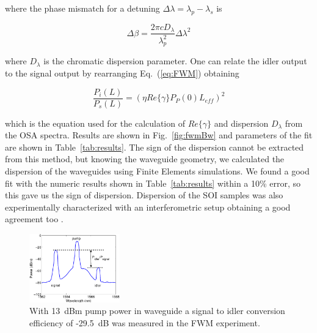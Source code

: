 \documentclass[10pt,letterpaper]{article}
\begin{document}
where the phase mismatch for a detuning $ \Delta\lambda = \lambda_p-\lambda_s$ is

\begin{equation}
        \Delta \beta=\frac{2\pi cD_\lambda}{\lambda_p^2}\Delta\lambda^2
\end{equation}

where $D_\lambda$ is the chromatic dispersion parameter. One can relate the idler output to the signal output by rearranging Eq.~(\ref{eq:FWM}) obtaining

\begin{equation}
        \frac{P_i(L)}{P_s(L)}=(\eta Re\{\gamma\}P_P(0)L_{eff})^2 
\label{eq:ratio}
\end{equation}

which is the equation used for the calculation of $Re\{\gamma\}$ and dispersion $D_\lambda$ from the OSA spectra. Results are shown in Fig.~\ref{fig:fwmBw} and parameters of the fit are shown in Table~\ref{tab:results}. The sign of the dispersion cannot be extracted from this method, but knowing the waveguide geometry, we calculated the dispersion of the waveguides using Finite Elements simulations. We found a good fit with the numeric results shown in Table~\ref{tab:results} within a 10\% error, so this gave us the sign of dispersion. Dispersion of the SOI samples was also experimentally characterized with an interferometric setup obtaining a good agreement too \cite{Mas2012}.




\begin{figure}[htb]
    \centering
    \includegraphics[width=0.35\textwidth]{Power_dBm_fwm_convEffMax_29p5dB}
    \caption{With 13~dBm pump power in waveguide a signal to idler conversion efficiency of -29.5~dB was measured in the FWM experiment.}
    \label{fig:fwmOSA}
\end{figure}
\end{document}
